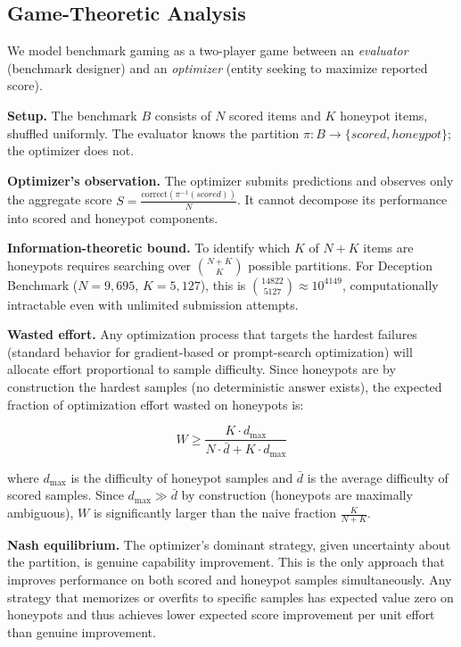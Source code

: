 \documentclass[conference]{IEEEtran}
\begin{document}
\subsection{Game-Theoretic Analysis}

We model benchmark gaming as a two-player game between an \emph{evaluator} (benchmark designer) and an \emph{optimizer} (entity seeking to maximize reported score).

\textbf{Setup.} The benchmark $B$ consists of $N$ scored items and $K$ honeypot items, shuffled uniformly. The evaluator knows the partition $\pi: B \rightarrow \{scored, honeypot\}$; the optimizer does not.

\textbf{Optimizer's observation.} The optimizer submits predictions and observes only the aggregate score $S = \frac{\text{correct}(\pi^{-1}(scored))}{N}$. It cannot decompose its performance into scored and honeypot components.

\textbf{Information-theoretic bound.} To identify which $K$ of $N+K$ items are honeypots requires searching over $\binom{N+K}{K}$ possible partitions. For Deception Benchmark ($N=9{,}695$, $K=5{,}127$), this is $\binom{14822}{5127} \approx 10^{4149}$, computationally intractable even with unlimited submission attempts.

\textbf{Wasted effort.} Any optimization process that targets the hardest failures (standard behavior for gradient-based or prompt-search optimization) will allocate effort proportional to sample difficulty. Since honeypots are by construction the hardest samples (no deterministic answer exists), the expected fraction of optimization effort wasted on honeypots is:

\begin{equation}
W \geq \frac{K \cdot d_{\max}}{N \cdot \bar{d} + K \cdot d_{\max}}
\end{equation}

where $d_{\max}$ is the difficulty of honeypot samples and $\bar{d}$ is the average difficulty of scored samples. Since $d_{\max} \gg \bar{d}$ by construction (honeypots are maximally ambiguous), $W$ is significantly larger than the naive fraction $\frac{K}{N+K}$.

\textbf{Nash equilibrium.} The optimizer's dominant strategy, given uncertainty about the partition, is genuine capability improvement. This is the only approach that improves performance on both scored and honeypot samples simultaneously. Any strategy that memorizes or overfits to specific samples has expected value zero on honeypots and thus achieves lower expected score improvement per unit effort than genuine improvement.
\end{document}
